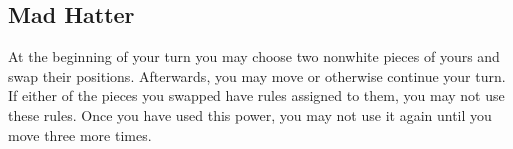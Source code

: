 \documentclass[../rulebook.tex]{subfiles}
\begin{document}
\subsection*{Mad Hatter}

At the beginning of your turn you may choose two nonwhite pieces of yours and swap their positions. Afterwards, you may move or otherwise continue your turn. If either of the pieces you swapped have rules assigned to them, you may not use these rules. Once you have used this power,
you may not use it again until you move three more times.
\end{document}
